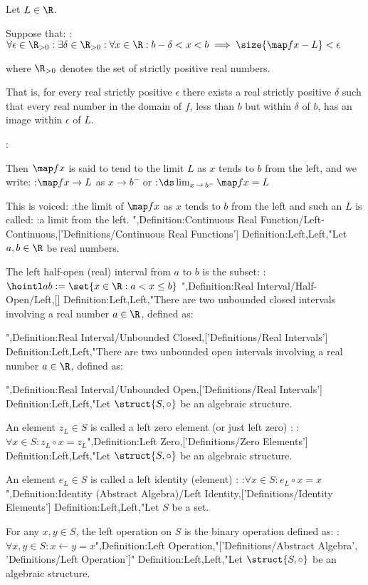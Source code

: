 Let $L \in \R$.


Suppose that:
:$\forall \epsilon \in \R_{>0}: \exists \delta \in \R_{>0}: \forall x \in \R: b - \delta < x < b \implies \size {\map f x - L} < \epsilon$

where $\R_{>0}$ denotes the set of strictly positive real numbers.

That is, for every real strictly positive $\epsilon$ there exists a real strictly positive $\delta$ such that every real number in the domain of $f$, less than $b$ but within $\delta$ of $b$, has an image within $\epsilon$ of $L$.


:

Then $\map f x$ is said to tend to the limit $L$ as $x$ tends to $b$ from the left, and we write:
:$\map f x \to L$ as $x \to b^-$
or
:$\ds \lim_{x \mathop \to b^-} \map f x = L$


This is voiced:
:the limit of $\map f x$ as $x$ tends to $b$ from the left
and such an $L$ is called:
:a limit from the left.
",Definition:Continuous Real Function/Left-Continuous,['Definitions/Continuous Real Functions']
Definition:Left,Left,"Let $a, b \in \R$ be real numbers.


The left half-open (real) interval from $a$ to $b$ is the subset:
:$\hointl a b := \set {x \in \R: a < x \le b}$
",Definition:Real Interval/Half-Open/Left,[]
Definition:Left,Left,"There are two unbounded closed intervals involving a real number $a \in \R$, defined as:




",Definition:Real Interval/Unbounded Closed,['Definitions/Real Intervals']
Definition:Left,Left,"There are two unbounded open intervals involving a real number $a \in \R$, defined as:




",Definition:Real Interval/Unbounded Open,['Definitions/Real Intervals']
Definition:Left,Left,"Let $\struct {S, \circ}$ be an algebraic structure.

An element $z_L \in S$ is called a left zero element (or just left zero) :
:$\forall x \in S: z_L \circ x = z_L$",Definition:Left Zero,['Definitions/Zero Elements']
Definition:Left,Left,"Let $\struct {S, \circ}$ be an algebraic structure.

An element $e_L \in S$ is called a left identity (element) :
:$\forall x \in S: e_L \circ x = x$
",Definition:Identity (Abstract Algebra)/Left Identity,['Definitions/Identity Elements']
Definition:Left,Left,"Let $S$ be a set.

For any $x, y \in S$, the left operation on $S$ is the binary operation defined as:
:$\forall x, y \in S: x \gets y = x$",Definition:Left Operation,"['Definitions/Abstract Algebra', 'Definitions/Left Operation']"
Definition:Left,Left,"Let $\struct {S, \circ}$ be an algebraic structure.


